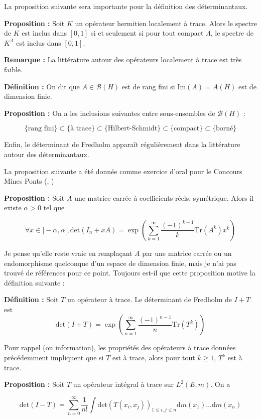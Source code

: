 \documentclass[12pt]{article}
\let\oldsum\sum
\renewcommand{\sum}{\oldsum\limits}
\begin{document}
La proposition suivante sera importante pour la définition des déterminantaux.

\textbf{Proposition :} Soit $K$ un opérateur hermitien localement à trace. Alors le spectre de $K$ est inclus dans $[0,1]$ si et seulement si pour tout compact $ \Lambda $, le spectre de $ K^\Lambda $ est inclus dans $[0,1]$.

\textbf{Remarque :} La littérature autour des opérateurs localement à trace est très faible.

\textbf{Définition :} On dit que $A \in \mathcal B(H) $ est de rang fini si $ \mathrm{Im}(A) = A(H) $ est de dimension finie.

\textbf{Proposition : } On a les inclusions suivantes entre sous-ensembles de $ \mathcal B(H)$ : 

$$ \{ \text{rang fini} \} \subset \{ \text{à trace} \} \subset \{ \text{Hilbert-Schmidt} \} \subset \{ \text{compact} \} \subset \{ \text{borné} \} $$

Enfin, le déterminant de Fredholm apparaît régulièrement dans la littérature autour des déterminantaux. 

La proposition suivante a été donnée comme exercice d'oral pour le Concours Mines Ponts (\cite{RMS20221}, \cite{RMS20223})

\textbf{Proposition :} Soit $A$ une matrice carrée à coefficients réels, symétrique. Alors il existe $ \alpha > 0 $ tel que 

$$ \forall x \in ]-\alpha, \alpha[, \mathrm{det}(I_n + x A) = \exp\left( \sum_{k=1}^\infty \frac{(-1)^{k-1}}{k} \mathrm{Tr}(A^k) x^k\right) $$

Je pense qu'elle reste vraie en remplaçant $A$ par une matrice carrée ou un endomorphisme quelconque d'un espace de dimension finie, mais je n'ai pas trouvé de références pour ce point. Toujours est-il que cette proposition motive la définition suivante :

\textbf{Définition :} Soit $T$ un opérateur à trace. Le déterminant de Fredholm de $ I + T $ est $$ \mathrm{det}(I + T) = \exp \left( \sum_{n=1}^\infty \frac{(-1)^{n-1}}{n} \mathrm{Tr}(T^k) \right) $$

Pour rappel (ou information), les propriétés des opérateurs à trace données précédemment impliquent que si $T$ est à trace, alors pour tout $ k\geqslant 1$, $ T^k$ est à trace.

\textbf{Proposition :} Soit $T$ un opérateur intégral à trace sur $ L^2(E, m) $. On a 

$$ \mathrm{det}(I - T) =  \sum_{n=0}^\infty \frac{1}{n!} \int \mathrm{det}(T(x_i,x_j))_{1\leqslant i,j \leqslant n} \mathrm d m(x_1) ... \mathrm d m(x_n) $$
\end{document}
